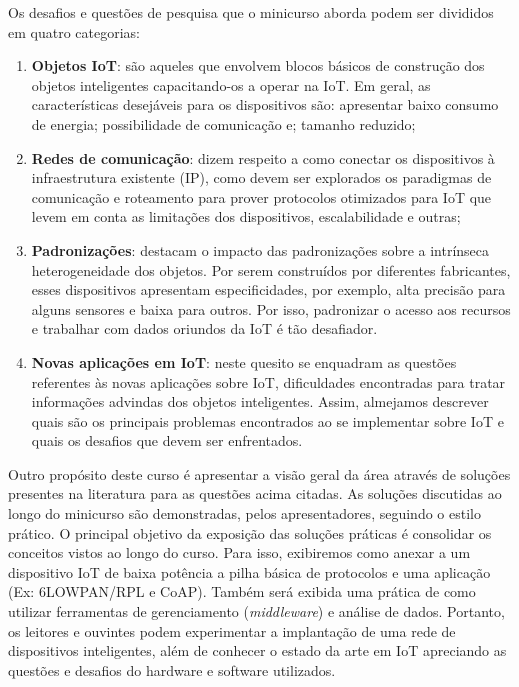 \documentclass{SBCbookchapter}
\begin{document}
Os desafios e questões de pesquisa que o minicurso aborda podem ser divididos 
em quatro categorias:

\begin{enumerate}[label=\roman*)]
  \item \textbf{Objetos IoT}: são aqueles que envolvem blocos básicos de 
construção dos objetos inteligentes capacitando-os a operar na IoT. Em geral, as 
características desejáveis para os dispositivos são: apresentar baixo consumo de 
energia; possibilidade de comunicação e; tamanho reduzido;
  
  \item \textbf{Redes de comunicação}: dizem respeito a como conectar os 
dispositivos à infraestrutura existente (IP), como devem ser explorados os 
paradigmas de comunicação e roteamento para prover protocolos otimizados para 
IoT que levem em conta as limitações dos dispositivos, escalabilidade e outras;

  \item \textbf{Padronizações}: destacam o impacto das padronizações sobre 
a intrínseca heterogeneidade dos objetos. Por serem construídos por diferentes 
fabricantes, esses dispositivos apresentam especificidades, por exemplo, alta 
precisão para alguns sensores e baixa para outros. Por isso, padronizar o 
acesso aos recursos e trabalhar com dados oriundos da IoT é tão desafiador. 

  \item \textbf{Novas aplicações em IoT}: neste quesito se enquadram as 
questões referentes às novas aplicações sobre IoT, dificuldades encontradas 
para tratar informações advindas dos objetos inteligentes. Assim, almejamos 
descrever quais são os principais problemas encontrados ao se implementar sobre 
IoT e quais os desafios que devem ser enfrentados. 
\end{enumerate}

\noindent Outro propósito deste curso é apresentar a visão geral da área 
através de soluções presentes na literatura para as questões acima citadas. As 
soluções discutidas ao longo do minicurso são demonstradas, pelos 
apresentadores, seguindo o estilo prático. O principal objetivo da exposição 
das soluções práticas é consolidar os conceitos vistos ao longo do curso. Para 
isso, exibiremos  como anexar a um dispositivo IoT de baixa potência a pilha 
básica de protocolos e uma aplicação (Ex: 6LOWPAN/RPL e CoAP). Também será 
exibida uma prática de como utilizar ferramentas de gerenciamento 
(\textit{middleware}) e análise de dados. Portanto, os leitores e ouvintes 
podem experimentar a implantação de uma rede de dispositivos inteligentes, além 
de conhecer o estado da arte em IoT apreciando as questões e desafios do 
hardware e software utilizados.
\end{document}
